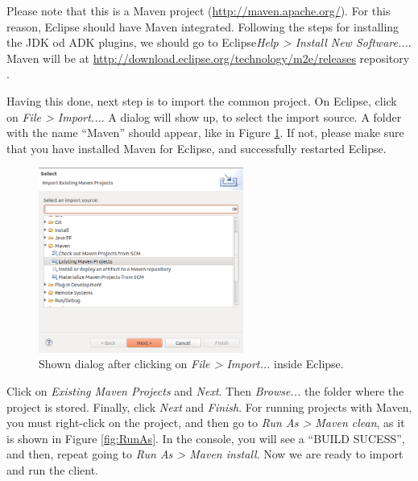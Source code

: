 Please note that this is a Maven project (\url{http://maven.apache.org/}). For this reason, Eclipse should have Maven integrated. Following the steps for installing the JDK od ADK plugins, we should go to Eclipse\textit{Help > Install New Software...}. Maven will be at \url{http://download.eclipse.org/technology/m2e/releases} repository \cite{m2eclipse:site}.

Having this done, next step is to import the common project. On Eclipse, click on \textit{File > Import...}. A dialog will show up, to select the import source. A folder with the name ``Maven'' should appear, like in Figure \ref{fig:importdialog}. If not, please make sure that you have installed Maven for Eclipse, and successfully restarted Eclipse.

\begin{figure}
  \begin{center}
    \includegraphics[width=0.6\textwidth]{./Figures/importdialog.png}
    \caption{Shown dialog after clicking on \textit{File > Import...} inside Eclipse.}
    \label{fig:importdialog}
  \end{center}
\end{figure}

Click on \textit{Existing Maven Projects} and \textit{Next}. Then \textit{Browse...} the folder where the project is stored. Finally, click \textit{Next} and \textit{Finish}. For running projects with Maven, you must right-click on the project, and then go to \textit{Run As > Maven clean}, as it is shown in Figure \ref{fig:RunAs}. In the console, you will see a ``BUILD SUCESS'', and then, repeat going to \textit{Run As > Maven install}. Now we are ready to import and run the client.

